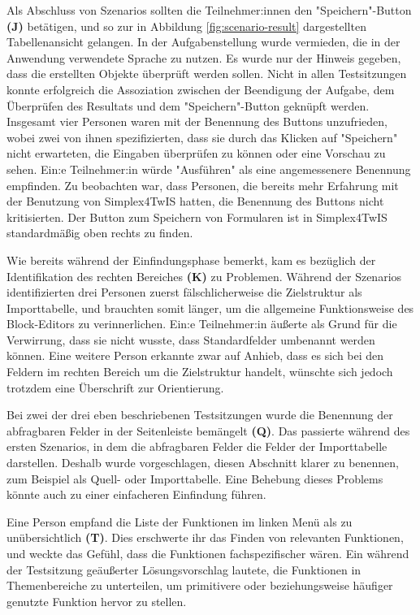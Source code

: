 Als Abschluss von Szenarios sollten die Teilnehmer:innen den "Speichern"-Button \textbf{(J)} betätigen, und so zur in Abbildung \ref{fig:scenario-result} dargestellten Tabellenansicht gelangen. In der Aufgabenstellung wurde vermieden, die in der Anwendung verwendete Sprache zu nutzen. Es wurde nur der Hinweis gegeben, dass die erstellten Objekte überprüft werden sollen. Nicht in allen Testsitzungen konnte erfolgreich die Assoziation zwischen der Beendigung der Aufgabe, dem Überprüfen des Resultats und dem "Speichern"-Button geknüpft werden. Insgesamt vier Personen waren mit der Benennung des Buttons unzufrieden, wobei zwei von ihnen spezifizierten, dass sie durch das Klicken auf "Speichern" nicht erwarteten, die Eingaben überprüfen zu können oder eine Vorschau zu sehen. Ein:e Teilnehmer:in würde "Ausführen" als eine angemessenere Benennung empfinden. Zu beobachten war, dass Personen, die bereits mehr Erfahrung mit der Benutzung von Simplex4TwIS hatten, die Benennung des Buttons nicht kritisierten. Der Button zum Speichern von Formularen ist in Simplex4TwIS standardmäßig oben rechts zu finden.

Wie bereits während der Einfindungsphase bemerkt, kam es bezüglich der Identifikation des rechten Bereiches \textbf{(K)} zu Problemen. Während der Szenarios identifizierten drei Personen zuerst fälschlicherweise die Zielstruktur als Importtabelle, und brauchten somit länger, um die allgemeine Funktionsweise des Block-Editors zu verinnerlichen. Ein:e Teilnehmer:in äußerte als Grund für die Verwirrung, dass sie nicht wusste, dass Standardfelder umbenannt werden können. Eine weitere Person erkannte zwar auf Anhieb, dass es sich bei den Feldern im rechten Bereich um die Zielstruktur handelt, wünschte sich jedoch trotzdem eine Überschrift zur Orientierung.

Bei zwei der drei eben beschriebenen Testsitzungen wurde die Benennung der abfragbaren Felder in der Seitenleiste bemängelt \textbf{(Q)}. Das passierte während des ersten Szenarios, in dem die abfragbaren Felder die Felder der Importtabelle darstellen. Deshalb wurde vorgeschlagen, diesen Abschnitt klarer zu benennen, zum Beispiel als Quell- oder Importtabelle. Eine Behebung dieses Problems könnte auch zu einer einfacheren Einfindung führen.

Eine Person empfand die Liste der Funktionen im linken Menü als zu unübersichtlich \textbf{(T)}. Dies erschwerte ihr das Finden von relevanten Funktionen, und weckte das Gefühl, dass die Funktionen fachspezifischer wären. Ein während der Testsitzung geäußerter Lösungsvorschlag lautete, die Funktionen in Themenbereiche zu unterteilen, um primitivere oder beziehungsweise häufiger genutzte Funktion hervor zu stellen.

